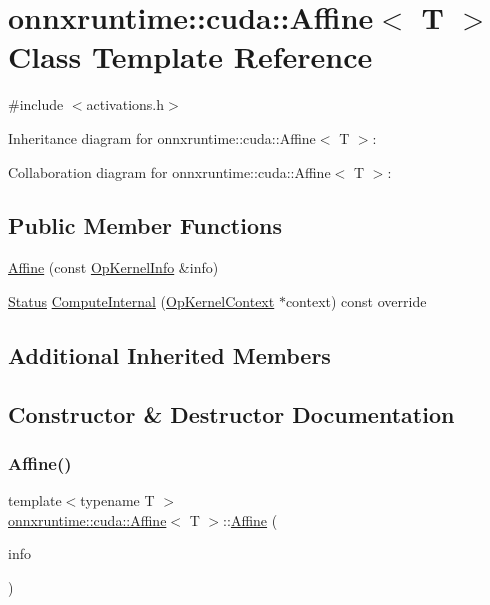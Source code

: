 \hypertarget{classonnxruntime_1_1cuda_1_1Affine}{}\section{onnxruntime\+:\+:cuda\+:\+:Affine$<$ T $>$ Class Template Reference}
\label{classonnxruntime_1_1cuda_1_1Affine}


{\ttfamily \#include $<$activations.\+h$>$}



Inheritance diagram for onnxruntime\+:\+:cuda\+:\+:Affine$<$ T $>$\+:


Collaboration diagram for onnxruntime\+:\+:cuda\+:\+:Affine$<$ T $>$\+:
\subsection*{Public Member Functions}
\begin{DoxyCompactItemize}
\item 
\mbox{\hyperlink{classonnxruntime_1_1cuda_1_1Affine_aa3fa672f4150ab722382f8cce3ba2517}{Affine}} (const \mbox{\hyperlink{classonnxruntime_1_1OpKernelInfo}{Op\+Kernel\+Info}} \&info)
\item 
\mbox{\hyperlink{classonnxruntime_1_1common_1_1Status}{Status}} \mbox{\hyperlink{classonnxruntime_1_1cuda_1_1Affine_a4827c81adfbb36f9f48367e7928961ce}{Compute\+Internal}} (\mbox{\hyperlink{classonnxruntime_1_1OpKernelContext}{Op\+Kernel\+Context}} $\ast$context) const override
\end{DoxyCompactItemize}
\subsection*{Additional Inherited Members}


\subsection{Constructor \& Destructor Documentation}
\mbox{\label{classonnxruntime_1_1cuda_1_1Affine_aa3fa672f4150ab722382f8cce3ba2517}} 
\subsubsection{\texorpdfstring{Affine()}{Affine()}}
{\footnotesize\ttfamily template$<$typename T $>$ \\
\mbox{\hyperlink{classonnxruntime_1_1cuda_1_1Affine}{onnxruntime\+::cuda\+::\+Affine}}$<$ T $>$\+::\mbox{\hyperlink{classonnxruntime_1_1cuda_1_1Affine}{Affine}} (\begin{DoxyParamCaption}\item[{const \mbox{\hyperlink{classonnxruntime_1_1OpKernelInfo}{Op\+Kernel\+Info}} \&}]{info }\end{DoxyParamCaption})\hspace{0.3cm}{\ttfamily [inline]}}



